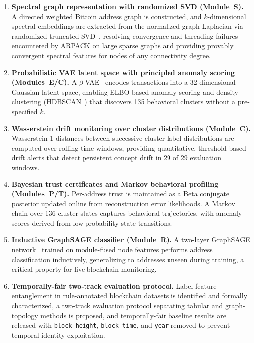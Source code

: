 \documentclass[journal]{IEEEtran}
\begin{document}
\begin{enumerate}[leftmargin=*, label=\textbf{C\arabic*}]

  \item \textbf{Spectral graph representation with randomized SVD
    (Module~S).}
    A directed weighted Bitcoin address graph is constructed, and
    $k$-dimensional spectral embeddings are extracted from the normalized
    graph Laplacian via randomized truncated SVD~\cite{Halko2011}, resolving
    convergence and threading failures encountered by ARPACK on large sparse
    graphs and providing provably convergent spectral features for nodes of
    any connectivity degree.

  \item \textbf{Probabilistic VAE latent space with principled anomaly
    scoring (Modules~E/C).}
    A $\beta$-VAE~\cite{Kingma2014} encodes transactions into a
    \num{32}-dimensional Gaussian latent space, enabling ELBO-based anomaly
    scoring and density clustering (HDBSCAN~\cite{McInnes2017}) that
    discovers \num{135} behavioral clusters without a pre-specified $k$.

  \item \textbf{Wasserstein drift monitoring over cluster distributions
    (Module~C).}
    Wasserstein-1 distances between successive cluster-label distributions
    are computed over rolling time windows, providing quantitative,
    threshold-based drift alerts that detect persistent concept drift in
    \num{29} of \num{29} evaluation windows.

  \item \textbf{Bayesian trust certificates and Markov behavioral profiling
    (Modules~P/T).}
    Per-address trust is maintained as a Beta conjugate posterior updated
    online from reconstruction error likelihoods.
    A Markov chain over \num{136} cluster states captures behavioral
    trajectories, with anomaly scores derived from low-probability
    state transitions.

  \item \textbf{Inductive GraphSAGE classifier (Module~R).}
    A two-layer GraphSAGE network~\cite{Hamilton2017} trained on
    module-fused node features performs address classification inductively,
    generalizing to addresses unseen during training, a critical property
    for live blockchain monitoring.

  \item \textbf{Temporally-fair two-track evaluation protocol.}
    Label-feature entanglement in rule-annotated blockchain datasets is
    identified and formally characterized, a two-track evaluation protocol
    separating tabular and graph-topology methods is proposed, and
    temporally-fair baseline results are released with
    \texttt{block\_height}, \texttt{block\_time}, and \texttt{year} removed
    to prevent temporal identity exploitation.


\end{enumerate}
\end{document}
